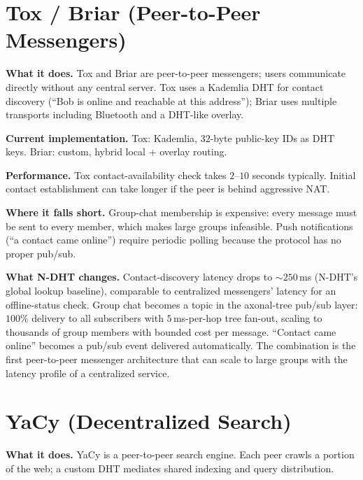 \documentclass[twoside,nobib]{tufte-book}
\newcommand{\NDHT}{N-DHT\xspace}
\begin{document}
\section{Tox / Briar (Peer-to-Peer Messengers)}

\textbf{What it does.} Tox and Briar are peer-to-peer
messengers; users communicate directly without any
central server. Tox uses a Kademlia DHT for contact discovery
(``Bob is online and reachable at this address''); Briar uses
multiple transports including Bluetooth and a DHT-like overlay.

\textbf{Current implementation.} Tox: Kademlia, $32$-byte
public-key IDs as DHT keys. Briar: custom, hybrid local +
overlay routing.

\textbf{Performance.} Tox contact-availability check takes
$2$--$10$ seconds typically. Initial contact establishment can
take longer if the peer is behind aggressive NAT.

\textbf{Where it falls short.} Group-chat membership is
expensive: every message must be sent to every member, which
makes large groups infeasible. Push notifications (``a contact
came online'') require periodic polling because the protocol has
no proper pub/sub.

\textbf{What \NDHT changes.} Contact-discovery latency drops to
$\sim 250$\,ms (\NDHT's global lookup baseline), comparable to
centralized messengers' latency for an offline-status check.
Group chat becomes a topic in the axonal-tree pub/sub layer:
$100\%$ delivery to all subscribers with $5$\,ms-per-hop tree
fan-out, scaling to thousands of group members with bounded
cost per message. ``Contact came online'' becomes a pub/sub
event delivered automatically. The combination is the first
peer-to-peer messenger architecture that can scale to large
groups with the latency profile of a centralized service.

\section{YaCy (Decentralized Search)}

\textbf{What it does.} YaCy is a peer-to-peer search engine.
Each peer crawls a portion of the web; a custom DHT mediates
shared indexing and query distribution.
\end{document}
